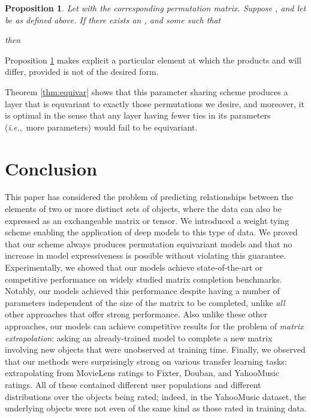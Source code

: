 \documentclass{article}
\newcommand{\ie}[0]{\emph{i.e.},~}
\newtheorem{proposition}[theorem]{Proposition}
\theoremstyle{definition}
\begin{document}
\begin{proposition}\label{prop:equivar2}
  Let  with  the corresponding permutation matrix. Suppose , and let  be as defined above. If there exists an , and some  such that 
    
    then
    
\end{proposition}

Proposition \ref{prop:equivar2} makes explicit a particular element at which the products  and  will differ, provided  is not of the desired form.

Theorem \ref{thm:equivar} shows that this parameter sharing scheme produces a layer that is equvariant to exactly those permutations we desire, and moreover, it is optimal in the sense that any layer having fewer ties in its parameters (\ie more parameters) would fail to be equivariant.  

\section*{Conclusion}\label{sec:discussion}
This paper has considered the problem of predicting relationships between the elements of two or more distinct sets of objects, where the data can also be expressed as an exchangeable matrix or tensor. We introduced a weight tying scheme enabling the application of deep models to this type of data. We proved that our scheme always produces permutation equivariant models and that no increase in model expressiveness is possible without violating this guarantee. Experimentally, we showed that our models achieve state-of-the-art or competitive performance on widely studied matrix completion benchmarks. Notably, our models achieved this performance despite having a number of parameters independent of the size of the matrix to be completed, unlike \emph{all} other approaches that offer strong performance. Also unlike these other approaches, our models can achieve competitive results for the problem of \emph{matrix extrapolation}: asking an already-trained model to complete a new matrix involving new objects that were unobserved at training time. 
Finally, we observed that our methods were surprisingly strong on various transfer learning tasks: extrapolating from MovieLens ratings to Fixter, Douban, and YahooMusic ratings. All of these contained different user populations and different distributions over the objects being rated; indeed, in the YahooMusic dataset, the underlying objects were not even of the same kind as those rated in training data.
\end{document}

